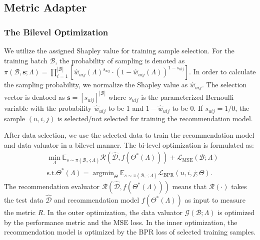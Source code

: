 \subsection{Metric Adapter}
\subsubsection{The Bilevel Optimization}
We utilize the assigned Shapley value for training sample selection. For the training batch $\mathcal{B}$, the probability of sampling is denoted as $\pi(\mathcal{B},\mathbf{s};{\Lambda}) = \prod_{i=1}^{|\mathcal{B}|}[\hat{w}_{uij}({\Lambda})^{s_{uij}} \cdot (1-\hat{w}_{uij}({\Lambda}))^{1-s_{uij}}]$. In order to calculate the sampling probability, we normalize the Shapley value as $\hat{w}_{uij}$. The selection vector is dentoed as $\mathbf{s}=[s_{uij}]^{|\mathcal{B}|}$ where $s_{uij}$ is the parameterized Bernoulli variable with the probability $\hat{w}_{uij}$ to be 1 and $1-\hat{w}_{uij}$ to be 0. If $s_{uij}=1/0$, the sample  $(u,i,j)$ is selected/not selected for training the recommendation model.

After data selection, we use the selected data to train the recommendation model and data valuator in a bilevel manner. The bi-level optimization is formulated as:
\begin{equation}
    \begin{aligned}
    &\min_{\Lambda}\mathbb{E}_{s \sim \pi(\mathcal{B},\cdot;{\Lambda})} \mathcal{R}(\hat{\mathcal{D}}, f(\Theta^*(\Lambda))) + \mathcal{L}_\text{MSE}(\mathcal{B};\Lambda) \\
    &\text{s.t.}\Theta^{*}(\Lambda)=\mathop{\arg\min}_{\Theta}\mathbb{E}_{s \sim \pi(\mathcal{B},\cdot;{\Lambda})} \mathcal{L}_{\text{BPR}}(u,i,j;\Theta).       
    \end{aligned}
    \label{eq:bilevel2}
\end{equation}
The recommendation evaluator $\mathcal{R}(\hat{\mathcal{D}}, f(\Theta^*(\Lambda)))$ means that $\mathcal{R}(\cdot)$ takes the test data $\hat{\mathcal{D}}$ and recommendation model $f(\Theta^*(\Lambda))$ as input to measure the metric $R$. In the outer optimization, the data valuator $\mathcal{G}(\mathcal{B};\Lambda)$ is optimized by the performance metric and the MSE loss. In the inner optimization, the recommendation model is optimized by the BPR loss of selected training samples.

